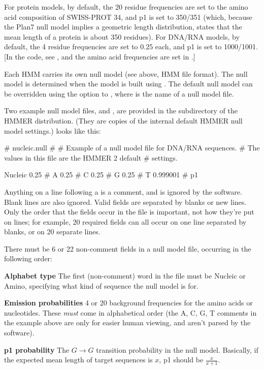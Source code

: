 For protein models, by default, the 20 residue frequencies are set to
the amino acid composition of SWISS-PROT 34, and p1 is set to 350/351
(which, because the Plan7 null model implies a geometric length
distribution, states that the mean length of a protein is about 350
residues). For DNA/RNA models, by default, the 4 residue frequencies
are set to 0.25 each, and p1 is set to 1000/1001.  [In the code, see
, and the amino acid frequencies are
set in .]

Each HMM carries its own null model (see above, HMM file format).  The
null model is determined when the model is built using
. The default null model can be overridden using
the  option to , where  is
the name of a null model file.  

Two example null model files,  and
, are provided in the  subdirectory
of the HMMER distribution. (They are copies of the internal default
HMMER null model settings.)   looks like this:

\begin{sreoutput}
# nucleic.null
#
# Example of a null model file for DNA/RNA sequences.
# The values in this file are the HMMER 2 default
# settings.

Nucleic
0.25     # A
0.25     # C
0.25     # G
0.25     # T
0.999001 # p1
\end{sreoutput}

Anything on a line following a \prog{\#} is a comment, and is ignored
by the software. Blank lines are also ignored. Valid fields are
separated by blanks or new lines. Only the order that the fields occur
in the file is important, not how they're put on lines; for example,
20 required fields can all occur on one line separated by blanks, or
on 20 separate lines. 

There must be 6 or 22 non-comment fields in a null model file,
occurring in the following order:

\begin{wideitem}
\item [\textbf{Alphabet type}] The first (non-comment) word in the
file must be Nucleic or Amino, specifying what kind of sequence the
null model is for.

\item [\textbf{Emission probabilities}] 4 or 20 background
frequencies for the amino acids or nucleotides. These \textit{must}
come in alphabetical order (the A, C, G, T comments in the example
above are only for easier human viewing, and aren't parsed by the
software).

\item [\textbf{p1 probability}] The $G \rightarrow G$ transition
probability in the null model. Basically, if the expected mean length
of target sequences is $x$, p1 should be $\frac{x}{x+1}$.
\end{wideitem}


